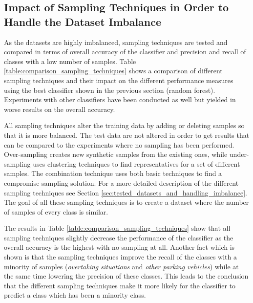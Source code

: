 \subsection{Impact of Sampling Techniques in Order to Handle the Dataset Imbalance}

As the datasets are highly imbalanced, sampling techniques are tested and compared in terms of overall accuracy of the classifier and precision and recall of classes with a low number of samples. Table \ref{table:comparison_sampling_techniques} shows a comparison of different sampling techniques and their impact on the different performance measures using the best classifier shown in the previous section (random forest). Experiments with other classifiers have been conducted as well but yielded in worse results on the overall accuracy.

All sampling techniques alter the training data by adding or deleting samples so that it is more balanced. The test data are not altered in order to get results that can be compared to the experiments where no sampling has been performed.
Over-sampling creates new synthetic samples from the existing ones, while under-sampling uses clustering techniques to find representatives for a set of different samples. The combination technique uses both basic techniques to find a compromise sampling solution. For a more detailed description of the different sampling techniques see Section \ref{sec:tested_datasets_and_handling_imbalance}. The goal of all these sampling techniques is to create a dataset where the number of samples of every class is similar. 

The results in Table \ref{table:comparison_sampling_techniques} show that all sampling techniques slightly decrease the performance of the classifier as the overall accuracy is the highest with no sampling at all. Another fact which is shown is that the sampling techniques improve the recall of the classes with a minority of samples (\emph{overtaking situations} and \emph{other parking vehicles}) while at the same time lowering the precision of these classes. This leads to the conclusion that the different sampling techniques make it more likely for the classifier to predict a class which has been a minority class.

